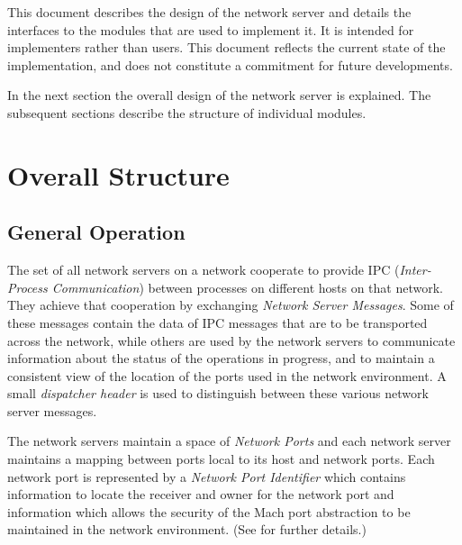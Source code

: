 This document describes the design of the network server and details
the interfaces to the modules that are used to implement it.  It is
intended for implementers rather than users. This document reflects
the current state of the implementation, and does not constitute a
commitment for future developments.

In the next section the overall design of the network server is
explained.  The subsequent sections describe the structure of
individual modules.

\section{Overall Structure}
\subsection{General Operation}
The set of all network servers on a network cooperate to provide IPC
({\it Inter-Process Communication}) between processes on different hosts on
that network.  They achieve that cooperation by exchanging {\it Network
Server Messages}.  Some of these messages contain the data of IPC messages
that are to be transported across the network, while others are used by the
network servers to communicate information about the status of the
operations in progress, and to maintain a consistent view of the location of
the ports used in the network environment.  A small {\it dispatcher header}
is used to distinguish between these various network server messages.

The network servers maintain a space of {\it Network Ports} and each network
server maintains a mapping between ports local to its host and network
ports.  Each network port is represented by a {\it Network Port Identifier}
which contains information to locate the receiver and owner for the network
port and information which allows the security of the Mach port abstraction
to be maintained in the network environment.  (See
\cite{EXTENDINGCAPABILITY} for further details.)

